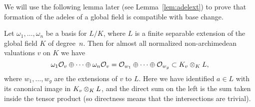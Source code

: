 We will use the following lemma later (see Lemma~\ref{lem:adelext}) to
prove that formation of the adeles of a global field
is compatible with base change.
\begin{lemma} \label{lem:ints_adeles}
Let $\omega_1,\ldots, \omega_n$ be a basis for $L/K$,
where $L$ is a finite separable extension of the global field
$K$ of degree~$n$.
Then for almost all normalized non-archimedean valuations $v$ on $K$ we
have
\begin{equation}\label{eqn:sum_int}
   \omega_1 \mathcal{O}_{v} \oplus \cdots \oplus \omega_n \mathcal{O}_{v}
      = \mathcal{O}_{w_1} \oplus \cdots \oplus \mathcal{O}_{w_g}
      \subset K_v\otimes_K L,
\end{equation}
where $w_1,\ldots, w_g$ are the extensions of $v$
to $L$.   Here we have identified $a\in L$ with
its canonical image in $K_v\otimes_K L$, and the direct
sum on the left is the sum taken inside the tensor
product (so directness means that the intersections are
trivial).
\end{lemma}
